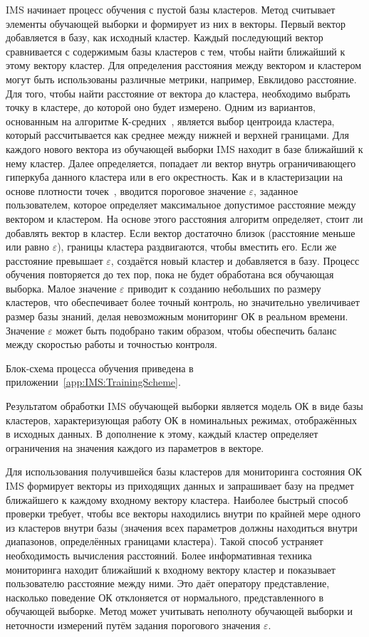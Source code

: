 IMS начинает процесс обучения с пустой базы кластеров. Метод считывает элементы обучающей выборки и формирует из них в векторы. Первый вектор добавляется в базу, как исходный кластер. Каждый последующий вектор сравнивается с содержимым базы кластеров с тем, чтобы найти ближайший к этому вектору кластер. Для определения расстояния между вектором и кластером могут быть использованы различные метрики, например, Евклидово расстояние. Для того, чтобы найти расстояние от вектора до кластера, необходимо выбрать точку в кластере, до которой оно будет измерено. Одним из вариантов, основанным на алгоритме К-средних~\cite{BradleyKMeans}, является выбор центроида кластера, который рассчитывается как среднее между нижней и верхней границами. Для каждого нового вектора из обучающей выборки IMS находит в базе ближайший к нему кластер. Далее определяется, попадает ли вектор внутрь ограничивающего гиперкуба данного кластера или в его окрестность. Как и в кластеризации на основе плотности точек~\cite{EsterDensityBasedClustering}, вводится пороговое значение $\varepsilon$, заданное пользователем, которое определяет максимальное допустимое расстояние между вектором и кластером. На основе этого расстояния алгоритм определяет, стоит ли добавлять вектор в кластер. Если вектор достаточно близок (расстояние меньше или равно $\varepsilon$), границы кластера раздвигаются, чтобы вместить его. Если же расстояние превышает $\varepsilon$, создаётся новый кластер и добавляется в базу. Процесс обучения повторяется до тех пор, пока не будет обработана вся обучающая выборка. Малое значение $\varepsilon$ приводит к созданию небольших по размеру кластеров, что обеспечивает более точный контроль, но значительно увеличивает размер базы знаний, делая невозможным мониторинг ОК в реальном времени. Значение $\varepsilon$ может быть подобрано таким образом, чтобы обеспечить баланс между скоростью работы и точностью контроля.

Блок-схема процесса обучения приведена в приложении~\ref{app:IMS:TrainingScheme}.

Результатом обработки IMS обучающей выборки является модель ОК в виде базы кластеров, характеризующая работу ОК в номинальных режимах, отображённых в исходных данных. В дополнение к этому, каждый кластер определяет ограничения на значения каждого из параметров в векторе.

Для использования получившейся базы кластеров для мониторинга состояния ОК IMS формирует векторы из приходящих данных и запрашивает базу на предмет ближайшего к каждому входному вектору кластера. Наиболее быстрый способ проверки требует, чтобы все векторы находились внутри по крайней мере одного из кластеров внутри базы (значения всех параметров должны находиться внутри диапазонов, определённых границами кластера). Такой способ устраняет необходимость вычисления расстояний. Более информативная техника мониторинга находит ближайший к входному вектору кластер и показывает пользователю расстояние между ними. Это даёт оператору представление, насколько поведение ОК отклоняется от нормального, представленного в обучающей выборке. Метод может учитывать неполноту обучающей выборки и неточности измерений путём задания порогового значения $\varepsilon$.


